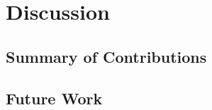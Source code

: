 \chapter{Discussion}
\label{chap:disc}

\section{Summary of Contributions}
\label{sec:disc_contrib}

\section{Future Work}
\label{sec:disc_future}

        